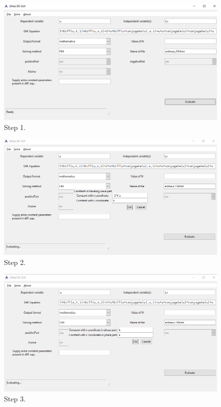 \documentclass[11pt,a4paper,titlepage]{article}
\begin{document}
\begin{figure}[H]
	\centering
	\includegraphics[width=\linewidth]{Ex1step1}
	\caption{ Step 1. }
	\label{fig:Ex1step1}
\end{figure}

\begin{figure}[H]
	\centering
	\includegraphics[width=\linewidth]{Ex1step2}
	\caption{ Step 2. }
	\label{fig:Ex1step2}
\end{figure}

\begin{figure}[H]
	\centering
	\includegraphics[width=\linewidth]{Ex1step3}
	\caption{ Step 3. }
	\label{fig:Ex1step3}
\end{figure}
\end{document}

